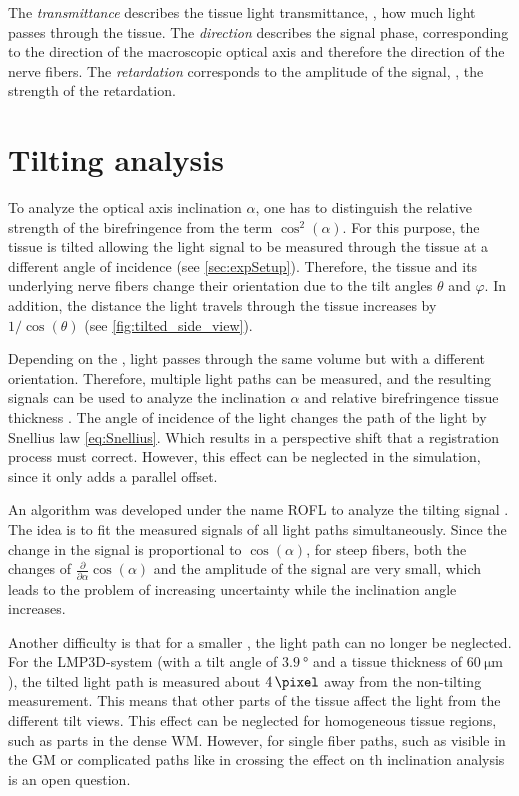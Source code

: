 %
The \textit{transmittance} describes the tissue light transmittance, \ie{}, how much light passes through the tissue.
The \textit{direction} describes the signal phase, corresponding to the direction of the macroscopic optical axis and therefore the direction of the nerve fibers.
The \textit{retardation} corresponds to the amplitude of the signal, \ie{}, the strength of the retardation.
%
%
\section{Tilting analysis} \label{sec::InclAnalysis}
%
To analyze the optical axis inclination $\alpha$, one has to distinguish the relative strength of the birefringence from the term $\cos^2(\alpha)$.
For this purpose, the tissue is tilted allowing the light signal to be measured through the tissue at a different angle of incidence \cite{Axer2011, Wiese:887678} (see \cref{sec:expSetup}).
Therefore, the tissue and its underlying nerve fibers change their orientation due to the tilt angles $\theta$ and $\varphi$.
In addition, the distance the light travels through the tissue increases by $1/\cos(\theta)$ (see \cref{fig:tilted_side_view}).
\par
%
Depending on the \Pixelsize{}, light passes through the same volume but with a different orientation.
Therefore, multiple light paths can be measured, and the resulting signals can be used to analyze the inclination $\alpha$ and relative birefringence tissue thickness \trel{}.
The angle of incidence of the light changes the path of the light by Snellius law \cref{eq:Snellius}.
Which results in a perspective shift that a registration process must correct.
However, this effect can be neglected in the simulation, since it only adds a parallel offset.
\par
%
An algorithm was developed under the name \ac{ROFL} to analyze the tilting signal \cite{Wiese:887678,Schmitz2018}.
The idea is to fit the measured signals of all light paths simultaneously.
Since the change in the signal is proportional to $\cos(\alpha)$, for steep fibers, both the changes of $\frac{\partial}{\partial \alpha} \cos(\alpha)$ and the amplitude of the signal are very small, which leads to the problem of increasing uncertainty while the inclination angle increases.
\par
%
Another difficulty is that for a smaller \Pixelsize{}, the light path can no longer be neglected.
For the \ac{LMP3D}-system (with a tilt angle of $\SI{3.9}{\degree}$ and a tissue thickness of $\SI{60}{\micro\meter}$), the tilted light path is measured about $\SI{4}{\pixel}$ away from the non-tilting measurement.
This means that other parts of the tissue affect the light from the different tilt views.
This effect can be neglected for homogeneous tissue regions, such as parts in the dense \ac{WM}.
However, for single fiber paths, such as visible in the \ac{GM} or complicated paths like in crossing the effect on th inclination analysis is an open question.
%
%
%
